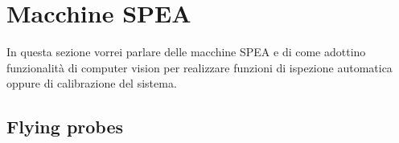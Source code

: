 


\section{Macchine SPEA}
In questa sezione vorrei parlare delle macchine SPEA e di come adottino
funzionalità di computer vision per realizzare funzioni di ispezione automatica
oppure di calibrazione del sistema.
\subsection{Flying probes}

